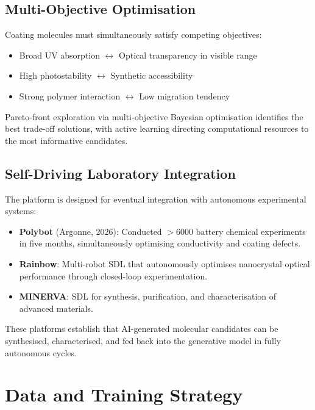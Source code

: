 \documentclass[11pt,a4paper]{article}
\begin{document}
\subsection{Multi-Objective Optimisation}

Coating molecules must simultaneously satisfy competing objectives:
\begin{itemize}[leftmargin=2em]
  \item Broad UV absorption $\leftrightarrow$ Optical transparency in visible range
  \item High photostability $\leftrightarrow$ Synthetic accessibility
  \item Strong polymer interaction $\leftrightarrow$ Low migration tendency
\end{itemize}

Pareto-front exploration via multi-objective Bayesian optimisation
identifies the best trade-off solutions, with active learning directing
computational resources to the most informative candidates.

\subsection{Self-Driving Laboratory Integration}

The platform is designed for eventual integration with autonomous
experimental systems:

\begin{itemize}[leftmargin=2em]
  \item \textbf{Polybot} (Argonne, 2026): Conducted $>$6000 battery chemical
    experiments in five months, simultaneously optimising conductivity and
    coating defects.
  \item \textbf{Rainbow}: Multi-robot SDL that autonomously optimises
    nanocrystal optical performance through closed-loop experimentation.
  \item \textbf{MINERVA}: SDL for synthesis, purification, and
    characterisation of advanced materials.
\end{itemize}

These platforms establish that AI-generated molecular candidates can be
synthesised, characterised, and fed back into the generative model in
fully autonomous cycles.

\section{Data and Training Strategy}
\end{document}
